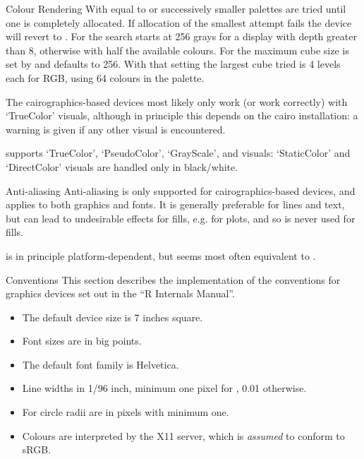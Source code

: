 \begin{Section}{Colour Rendering}
With  equal to  or 
successively smaller palettes are tried until one is completely
allocated.  If allocation of the smallest attempt fails the device will
revert to .  For  the search starts at 256
grays for a display with depth greater than 8, otherwise with half
the available colours.  For  the maximum cube size
is set by  and defaults to
256.  With that setting the largest cube tried is 4 levels each for
RGB, using 64 colours in the palette.



The cairographics-based devices most likely only work (or work
correctly) with `TrueColor' visuals, although in principle this
depends on the cairo installation: a warning is given if any other
visual is encountered.

 supports `TrueColor',
`PseudoColor', `GrayScale',  and
 visuals: `StaticColor' and
`DirectColor' visuals are handled only in black/white.
\end{Section}
%
\begin{Section}{Anti-aliasing}
Anti-aliasing is only supported for cairographics-based devices, and
applies to both graphics and fonts.  It is generally preferable for
lines and text, but can lead to undesirable effects for fills,
e.g. for  plots, and so is never used for fills.

 is in principle platform-dependent, but
seems most often equivalent to .
\end{Section}
%
\begin{Section}{Conventions}
This section describes the implementation of the conventions for
graphics devices set out in the ``R Internals Manual''.

\begin{itemize}

\item The default device size is 7 inches square.
\item Font sizes are in big points.
\item The default font family is Helvetica.
\item Line widths in 1/96 inch, minimum one pixel for , 0.01 otherwise.
\item For  circle radii are in pixels with
minimum one.
\item Colours are interpreted by the X11 server, which is
\emph{assumed} to conform to sRGB.

\end{itemize}

\end{Section}
